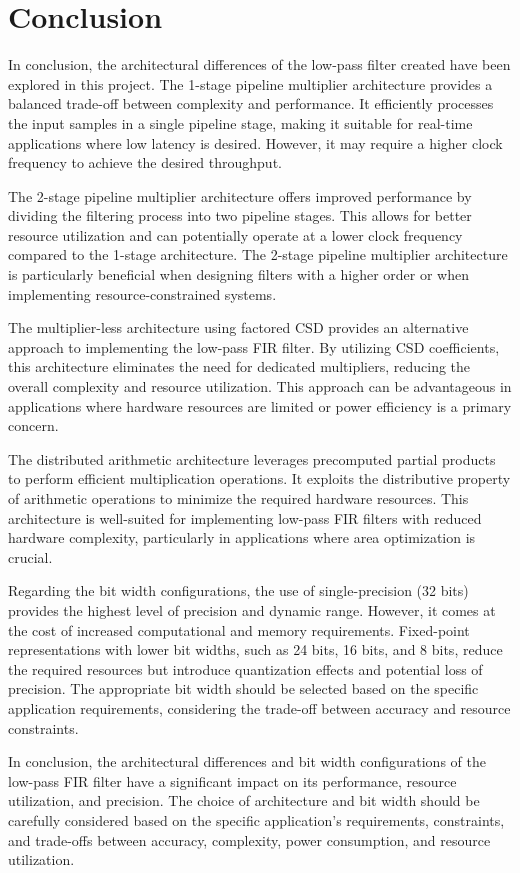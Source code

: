 
\section{Conclusion}
In conclusion, the architectural differences of the low-pass filter created have been explored in this project.
The 1-stage pipeline multiplier architecture provides a balanced trade-off between complexity and performance. It efficiently processes the input samples in a single pipeline stage, making it suitable for real-time applications where low latency is desired. However, it may require a higher clock frequency to achieve the desired throughput.

The 2-stage pipeline multiplier architecture offers improved performance by dividing the filtering process into two pipeline stages. This allows for better resource utilization and can potentially operate at a lower clock frequency compared to the 1-stage architecture. The 2-stage pipeline multiplier architecture is particularly beneficial when designing filters with a higher order or when implementing resource-constrained systems.

The multiplier-less architecture using factored CSD provides an alternative approach to implementing the low-pass FIR filter. By utilizing CSD coefficients, this architecture eliminates the need for dedicated multipliers, reducing the overall complexity and resource utilization. This approach can be advantageous in applications where hardware resources are limited or power efficiency is a primary concern.

The distributed arithmetic architecture leverages precomputed partial products to perform efficient multiplication operations. It exploits the distributive property of arithmetic operations to minimize the required hardware resources. This architecture is well-suited for implementing low-pass FIR filters with reduced hardware complexity, particularly in applications where area optimization is crucial.

Regarding the bit width configurations, the use of single-precision (32 bits) provides the highest level of precision and dynamic range. However, it comes at the cost of increased computational and memory requirements. Fixed-point representations with lower bit widths, such as 24 bits, 16 bits, and 8 bits, reduce the required resources but introduce quantization effects and potential loss of precision. The appropriate bit width should be selected based on the specific application requirements, considering the trade-off between accuracy and resource constraints.

In conclusion, the architectural differences and bit width configurations of the low-pass FIR filter have a significant impact on its performance, resource utilization, and precision. The choice of architecture and bit width should be carefully considered based on the specific application's requirements, constraints, and trade-offs between accuracy, complexity, power consumption, and resource utilization.